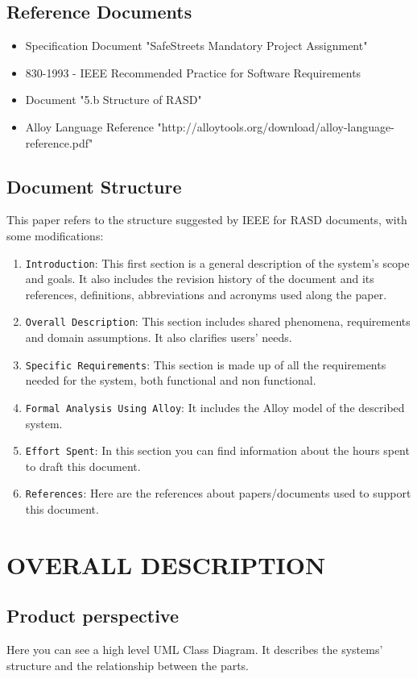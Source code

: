 \documentclass[12pt,a4paper]{article}
\begin{document}
\subsection{Reference Documents} 
\begin{itemize}
				\item Specification Document "SafeStreets Mandatory Project Assignment"
				\item 830-1993 - IEEE Recommended Practice for Software Requirements
				\item Document "5.b Structure of RASD"
				\item Alloy Language Reference "http://alloytools.org/download/alloy-language-reference.pdf"
			\end{itemize}
\newpage
\subsection{Document Structure} 
	This paper refers to the structure suggested by IEEE for RASD documents, with some modifications:
		\begin{enumerate}
			\item \texttt{Introduction}: This first section is a general description of the system's scope and goals. It also includes the revision history of the document and its references, definitions, abbreviations and acronyms used along the paper.
			\item \texttt{Overall Description}: This section includes shared phenomena, requirements and domain assumptions. It also clarifies users' needs.
			\item \texttt{Specific Requirements}: This section is made up of all the requirements needed for the system, both functional and non functional.
			\item \texttt{Formal Analysis Using Alloy}: It includes the Alloy model of the described system.
			\item \texttt{Effort Spent}: In this section you can find information about the hours spent to draft this document.
			\item \texttt{References}: Here are the references about papers/documents used to support this document.
		\end{enumerate}

\newpage
\section{OVERALL DESCRIPTION}
\subsection{Product perspective}
Here you can see a high level UML Class Diagram. It describes the systems' structure and the relationship between the parts.
\end{document}
